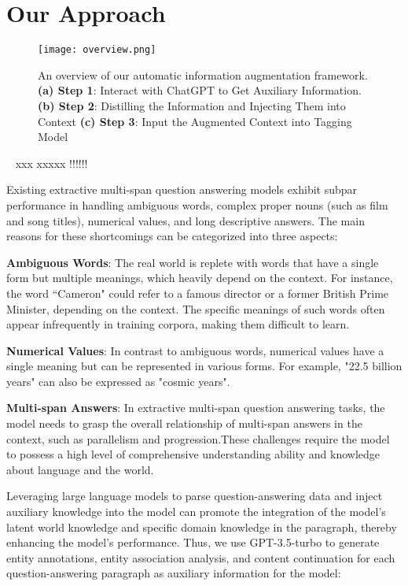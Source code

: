 \section{Our Approach}

\begin{figure*}[h]
	\centering
	\texttt{[image: overview.png]}
	\caption{An overview of our automatic information augmentation framework. \textbf{(a) Step 1}: Interact with ChatGPT to Get Auxiliary Information. \textbf{(b) Step 2}: Distilling the Information and Injecting Them into Context \textbf{(c) Step 3}: Input the Augmented Context into Tagging Model}
	\label{fig:overview}
\end{figure*}   


~ xxx xxxxx !!!!!!

Existing extractive multi-span question answering models exhibit subpar performance in handling ambiguous words, complex proper nouns (such as film and song titles), numerical values, and long descriptive answers. The main reasons for these shortcomings can be categorized into three aspects:

\textbf{Ambiguous Words}: The real world is replete with words that have a single form but multiple meanings, which heavily depend on the context. For instance, the word ``Cameron" could refer to a famous director or a former British Prime Minister, depending on the context. The specific meanings of such words often appear infrequently in training corpora, making them difficult to learn.

\textbf{Numerical Values}: In contrast to ambiguous words, numerical values have a single meaning but can be represented in various forms. For example, "22.5 billion years" can also be expressed as "cosmic years".

\textbf{Multi-span Answers}: In extractive multi-span question answering tasks, the model needs to grasp the overall relationship of multi-span answers in the context, such as parallelism and progression.These challenges require the model to possess a high level of comprehensive understanding ability and knowledge about language and the world. 

Leveraging large language models to parse question-answering data and inject auxiliary knowledge into the model can promote the integration of the model's latent world knowledge and specific domain knowledge in the paragraph, thereby enhancing the model's performance. Thus, we use GPT-3.5-turbo to generate entity annotations, entity association analysis, and content continuation for each question-answering paragraph as auxiliary information for the model:

